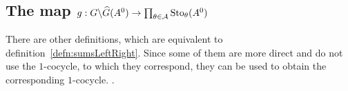 \begin{comment}
  \begin{cor}
    \marginnote{\cite[Cor.III.2.7]{Loday1994}}
    Write the twisted cocyle $\dot\phi\in\exp_{A^1}(\hat F^k)$ in terms of
    sums of $\hat F^k$ over $\cU^{\leq k}$:
    \[
      \dot \phi_\theta=S_\theta^-(\hat F^k)^{-1}S_\theta^+(\hat F^k)
      \text{, }
      \theta\in\A^{\leq k} \,.
    \]
    Then, the factors $\dot g^k=(\dot g^k_\theta)_{\theta\in\A^{\leq k}}$ and
    $\dot f^k=(\dot f^k_\theta)_{\theta\in\A^{\leq k}}$ in the induced
    decompositions satisfy
    \begin{align*}
      \dot g_\theta^k &=S_\theta^+(\hat F^{<k})^{-1}
                        S_\theta^-(\hat F^k)^{-1}
                        S_\theta^+(\hat F^k)
                        S_\theta^+(\hat F^{<k}) \,,
    \\\dot f_\theta^k &=S_\theta^-(\hat F^{<k})^{-1}
                        S_\theta^-(\hat F^k)^{-1}
                        S_\theta^+(\hat F^k)
                        S_\theta^+(\hat F^{<k}) \,.
    \end{align*}
  \end{cor}
\end{comment}

\subsection{The map
  $g:G\backslash\widehat G(A^0)\to\prod_{\theta\in\mathcal{A}}\operatorname{Sto}_\theta(A^0)$}
  \label{sect:multisummmap}
There are other definitions, which are equivalent to
definition~\ref{defn:sumsLeftRight}. Since some of them are more direct
and do not use the $1$-cocycle, to which they correspond, they can be used to
obtain the corresponding $1$-cocycle.  \cite{Loday2014}.

